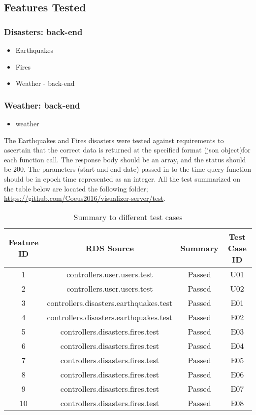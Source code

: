 \subsection{Features Tested}
\subsubsection{Disasters: back-end}
\begin{itemize}

	\item Earthquakes
	\item Fires
	\item Weather - back-end
	
\end{itemize}

\subsubsection{Weather: back-end}
\begin{itemize}

	\item weather
	
\end{itemize}

The Earthquakes and Fires disasters were tested against requirements to ascertain that the correct data is returned at the specified format (json object)for each function call. The response body should be an array, and the status should be 200. The parameters (start and end date) passed in to the time-query function should be in epoch time represented as an integer. All the test summarized on the table below are located the following folder; \url{https://github.com/Coeus2016/visualizer-server/test}.

\begin{table}[h!]
\caption{Summary to different test cases}
\centering
\begin{tabular}{| c c c c |}
\hline
Feature ID & RDS Source & Summary & Test Case ID \\ [0.5ex]
\hline\hline
1 & controllers.user.users.test & Passed & U01 \\
2 & controllers.user.users.test & Passed & U02 \\
3 & controllers.disasters.earthquakes.test & Passed & E01 \\
4 & controllers.disasters.earthquakes.test & Passed & E02 \\
5 & controllers.disasters.fires.test & Passed & E03 \\
6 & controllers.disasters.fires.test & Passed & E04 \\
7 & controllers.disasters.fires.test & Passed & E05 \\
8 & controllers.disasters.fires.test & Passed & E06 \\
9 & controllers.disasters.fires.test & Passed & E07 \\
10 & controllers.disasters.fires.test & Passed & E08 \\ [1ex]
\hline
\end{tabular}
\end{table}



